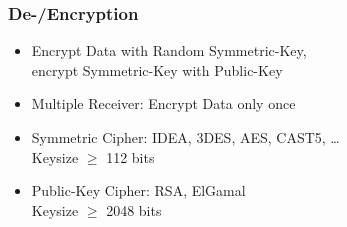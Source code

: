 \documentclass{beamer}
\begin{document}

\begin{frame}

	\frametitle{De-/Encryption}


	\begin{itemize}
		\item Encrypt Data with Random Symmetric-Key,\\ encrypt Symmetric-Key with Public-Key
		\item Multiple Receiver: Encrypt Data only once 
	\end{itemize}
		
	\begin{itemize}
		\item Symmetric Cipher: IDEA, 3DES, AES, CAST5, \ldots  \\
				\small Keysize $\geq$ 112 bits \cite{nist} 
		\item Public-Key Cipher: RSA, ElGamal \\
				\small Keysize $\geq$ 2048 bits \cite{nist} 
	\end{itemize}

\end{frame}

\end{document}
